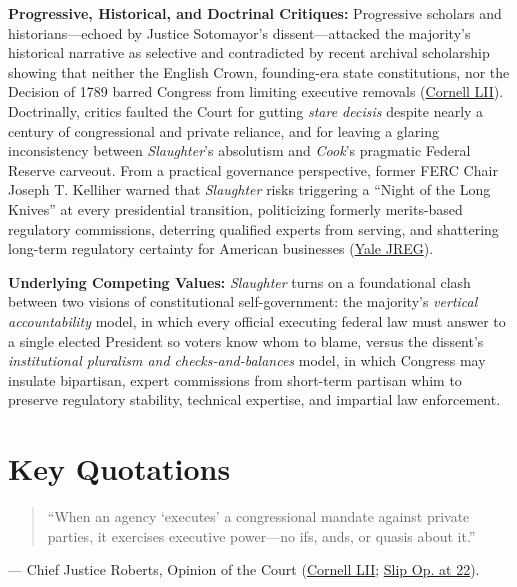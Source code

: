 \documentclass[12pt]{article}
\begin{document}
\textbf{Progressive, Historical, and Doctrinal Critiques:} Progressive scholars and historians---echoed by Justice Sotomayor's dissent---attacked the majority's historical narrative as selective and contradicted by recent archival scholarship showing that neither the English Crown, founding-era state constitutions, nor the Decision of 1789 barred Congress from limiting executive removals (\href{https://www.law.cornell.edu/supremecourt/text/25-332}{Cornell LII}). Doctrinally, critics faulted the Court for gutting \textit{stare decisis} despite nearly a century of congressional and private reliance, and for leaving a glaring inconsistency between \textit{Slaughter}'s absolutism and \textit{Cook}'s pragmatic Federal Reserve carveout. From a practical governance perspective, former FERC Chair Joseph T. Kelliher warned that \textit{Slaughter} risks triggering a ``Night of the Long Knives'' at every presidential transition, politicizing formerly merits-based regulatory commissions, deterring qualified experts from serving, and shattering long-term regulatory certainty for American businesses (\href{https://www.yalejreg.com/nc/implications-of-trump-v-slaughter-for-the-integrity-of-future-federal-commission-decisionmaking/}{Yale JREG}).

\textbf{Underlying Competing Values:} \textit{Slaughter} turns on a foundational clash between two visions of constitutional self-government: the majority's \emph{vertical accountability} model, in which every official executing federal law must answer to a single elected President so voters know whom to blame, versus the dissent's \emph{institutional pluralism and checks-and-balances} model, in which Congress may insulate bipartisan, expert commissions from short-term partisan whim to preserve regulatory stability, technical expertise, and impartial law enforcement.

\section{Key Quotations}

\begin{quote}
``When an agency `executes' a congressional mandate against private parties, it exercises executive power---no ifs, ands, or quasis about it.''
\end{quote}
\noindent --- Chief Justice Roberts, Opinion of the Court (\href{https://www.law.cornell.edu/supremecourt/text/25-332}{Cornell LII}; \href{https://www.supremecourt.gov/opinions/25pdf/25-322_new_4gcj.pdf}{Slip Op. at 22}).
\end{document}
